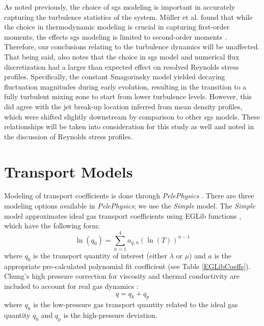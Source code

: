 As noted previously, the choice of \gls{sgs} modeling is important in accurately capturing the turbulence statistics of the system. M\"{u}ller et al. found that while the choice in thermodynamic modeling is crucial in capturing first-order moments, the effects \gls{sgs} modeling is limited to second-order moments \cite{doi:10.1063/1.4937948}. Therefore, our conclusions relating to the turbulence dynamics will be unaffected. That being said, \cite{doi:10.1063/1.4937948} also notes that the choice in \gls{sgs} model and numerical flux discretization had a larger than expected effect on resolved Reynolds stress profiles. Specifically, the constant Smagorinsky model yielded decaying fluctuation magnitudes during early evolution, resulting in the transition to a fully turbulent mixing zone to start from lower turbulence levels. However, this did agree with the jet break-up location inferred from mean density profiles, which were shifted slightly downstream by comparison to other \gls{sgs} models. These relationships will be taken into consideration for this study as well and noted in the discussion of Reynolds stress profiles.


\section{Transport Models}
Modeling of transport coefficients is done through \textit{PelePhysics} \cite{}. There are three modeling options available in \textit{PelePhysics}; we use the \textit{Simple} model. The \textit{Simple} model approximates ideal gas transport coefficients using EGLib functions \cite{ERN1995105}, which have the following form:
\begin{equation} \label{EGLib}
\ln{(q_0)} = \sum\limits_{n=1}^{4} a_{q,n}\left( \ln{(T)}\right)^{n-1}
\end{equation}
where $q_0$ is the transport quantity of interest (either $\lambda$ or $\mu$) and $a$ is the appropriate pre-calculated polynomial fit coefficient (see Table \ref{EGLibCoeffs}). Chung's high pressure correction for viscosity and thermal conductivity are included to account for real gas dynamics \cite{chung:1988}: 
\begin{equation} \label{chung_general}
q = q_k + q_p
\end{equation}
where $q_k$ is the low-pressure gas transport quantity related to the ideal gas quantity $q_0$ and $q_p$ is the high-pressure deviation. 

